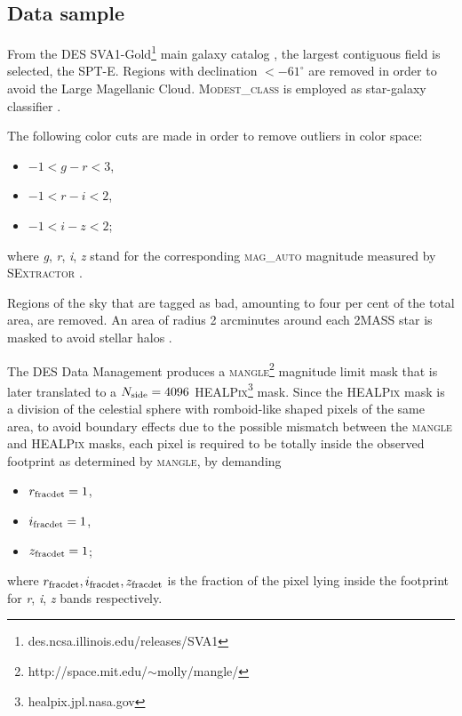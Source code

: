 \subsection{Data sample}
\label{sec:data_sample_SV}
From the DES SVA1-Gold\footnote{des.ncsa.illinois.edu/releases/SVA1} main galaxy catalog \cite{2016MNRAS.455.4301C}, the largest contiguous field is selected, the SPT-E. Regions with declination $ < -61^{\circ}$ are removed in order to avoid the Large Magellanic Cloud. {\scshape Modest\_class} is employed as star-galaxy classifier \cite{0004-637X-801-2-73}.
\newline

The following color cuts are made in order to remove outliers in color space:
\begin{itemize}
	\item $-1 < g-r < 3$,
	\item $-1 < r-i < 2$,
	\item $-1 < i-z < 2$;
\end{itemize}
where {\it g}, {\it r}, {\it i}, {\it z} stand for the corresponding {\scshape mag\_auto} magnitude measured by {\scshape SExtractor} \cite{1996A&AS..117..393B}.
\newline

Regions of the sky that are tagged as bad, amounting to four per cent of the total area, are removed. An area of radius 2 arcminutes around each 2MASS star is masked to avoid stellar halos \cite{2005MNRAS.361.1287M,0004-637X-633-2-589}.
\newline

The DES Data Management \cite{2011arXiv1109.6741S,2012ApJ...757...83D,2012SPIE.8451E..0DM} produces a {\scshape mangle}\footnote{http://space.mit.edu/$\sim$molly/mangle/} \cite{2008MNRAS.387.1391S}  magnitude limit mask that is later translated to a $N_{\rm side}=4096$ {\scshape HEALPix}\footnote{healpix.jpl.nasa.gov} \cite{2005ApJ...622..759G} mask. Since the {\scshape HEALPix} mask is a division of the celestial sphere with romboid-like shaped pixels of the same area, to avoid boundary effects due to the possible mismatch between the {\scshape mangle} and {\scshape HEALPix} masks, each pixel is required to be totally inside the observed footprint as determined by {\scshape mangle}, by demanding
\begin{itemize}
	\item $r_{\rm fracdet}=1$,
	\item $i_{\rm fracdet}=1$,
	\item $z_{\rm fracdet}=1$;
\end{itemize}
where $r_{\rm fracdet},i_{\rm fracdet},z_{\rm fracdet}$ is the fraction of the pixel lying inside the footprint for {\it r}, {\it i}, {\it z} bands respectively.
\newline

